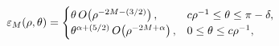 \[\varepsilon_{M}(\rho,\theta)=\begin{cases}\theta\mathop{O\/}\nolimits\!\left(%
\rho^{-2M-(3/2)}\right),&c\rho^{-1}\leq\theta\leq\pi-\delta,\\
\theta^{\alpha+(5/2)}\mathop{O\/}\nolimits\!\left(\rho^{-2M+\alpha}\right),&0%
\leq\theta\leq c\rho^{-1},\end{cases}\]
